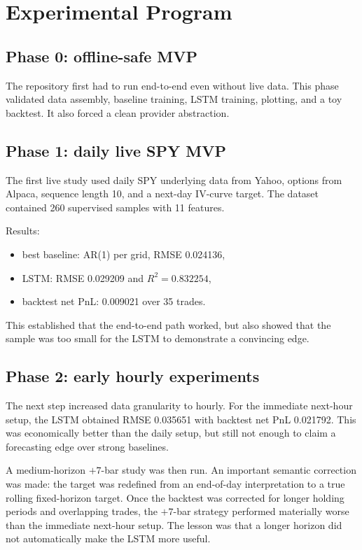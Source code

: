 \documentclass[12pt]{report}
\begin{document}
\chapter{Experimental Program}

\section{Phase 0: offline-safe MVP}
The repository first had to run end-to-end even without live data. This phase validated data assembly, baseline training, LSTM training, plotting, and a toy backtest. It also forced a clean provider abstraction.

\section{Phase 1: daily live SPY MVP}
The first live study used daily SPY underlying data from Yahoo, options from Alpaca, sequence length 10, and a next-day IV-curve target. The dataset contained 260 supervised samples with 11 features.

Results:
\begin{itemize}[leftmargin=1.2cm]
    \item best baseline: AR(1) per grid, RMSE 0.024136,
    \item LSTM: RMSE 0.029209 and $R^2=0.832254$,
    \item backtest net PnL: 0.009021 over 35 trades.
\end{itemize}

This established that the end-to-end path worked, but also showed that the sample was too small for the LSTM to demonstrate a convincing edge.

\section{Phase 2: early hourly experiments}
The next step increased data granularity to hourly. For the immediate next-hour setup, the LSTM obtained RMSE 0.035651 with backtest net PnL 0.021792. This was economically better than the daily setup, but still not enough to claim a forecasting edge over strong baselines.

A medium-horizon $+7$-bar study was then run. An important semantic correction was made: the target was redefined from an end-of-day interpretation to a true rolling fixed-horizon target. Once the backtest was corrected for longer holding periods and overlapping trades, the $+7$-bar strategy performed materially worse than the immediate next-hour setup. The lesson was that a longer horizon did not automatically make the LSTM more useful.
\end{document}
